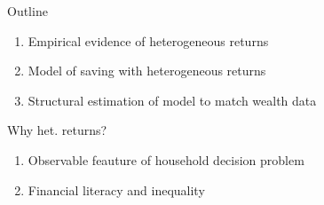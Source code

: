 \documentclass{beamer}
\begin{document}




    


\begin{frame}{Outline}
\begin{enumerate}
\item Empirical evidence of heterogeneous returns
\item Model of saving with heterogeneous returns
\item Structural estimation of model to match wealth data
\end{enumerate}

\end{frame}

\begin{frame}{Why het. returns?}
\begin{enumerate}
\item Observable feauture of household decision problem
\item Financial literacy and inequality
\end{enumerate}
\end{frame}
\end{document}
